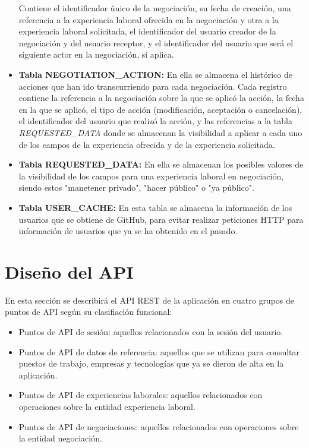 \documentclass[a4paper, 12pt]{book}
\begin{document}
\begin{itemize}
        Contiene el identificador único de la negociación, su fecha de creación, una referencia a la experiencia laboral ofrecida en la negociación y otra a la experiencia laboral solicitada, el identificador del usuario creador de la negociación y del usuario receptor, y el identificador del usuario que será el siguiente actor en la negociación, si aplica.
        \item \textbf{Tabla NEGOTIATION\_ACTION:} En ella se almacena el histórico de acciones que han ido transcurriendo para cada negociación.
        Cada registro contiene la referencia a la negociación sobre la que se aplicó la acción, la fecha en la que se aplicó, el tipo de acción (modificación, aceptación o cancelación), el identificador del usuario que realizó la acción,
        y las referencias a la tabla \emph{REQUESTED\_DATA} donde se almacenan la visibilidad a aplicar a cada uno de los campos de la experiencia ofrecida y de la experiencia solicitada.
        \item \textbf{Tabla REQUESTED\_DATA:} En ella se almacenan los posibles valores de la visibilidad de los campos para una experiencia laboral en negociación, siendo estos "manetener privado", "hacer público" o "ya público".
        \item \textbf{Tabla USER\_CACHE:} En esta tabla se almacena la información de los usuarios que se obtiene de GitHub, para evitar realizar peticiones HTTP para información de usuarios que ya se ha obtenido en el pasado.
    \end{itemize}


    \section{Diseño del API}
    \label{sec:api_desing}
    En esta sección se describirá el API REST de la aplicación en cuatro grupos de puntos de API según su clasifiación funcional:

    \begin{itemize}
        \item Puntos de API de sesión: aquellos relacionados con la sesión del usuario.
        \item Puntos de API de datos de referencia: aquellos que se utilizan para consultar puestos de trabajo, empresas y tecnologías que ya se dieron de alta en la aplicación.
        \item Puntos de API de experiencias laborales: aquellos relacionados con operaciones sobre la entidad experiencia laboral.
        \item Puntos de API de negociaciones: aquellos relacionados con operaciones sobre la entidad negociación.
    \end{itemize}
\end{document}
